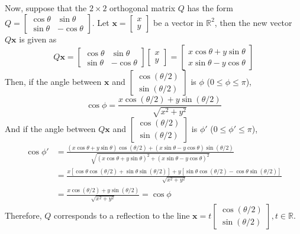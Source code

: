 Now, suppose that the $2 \times 2$ orthogonal matrix $Q$ has the form $Q = \begin{bmatrix}
	\cos \theta & \sin \theta \\ \sin \theta & -\cos \theta
\end{bmatrix}$. Let $\textbf{x} = \begin{bmatrix}
	x \\ y
\end{bmatrix}$ be a vector in $\mathbb{R}^2$, then the new vector $Q\textbf{x}$ is given as \begin{equation*}
	Q\textbf{x} = \begin{bmatrix}
		\cos \theta & \sin \theta \\ \sin \theta & -\cos \theta
	\end{bmatrix} \begin{bmatrix}
		x \\ y
	\end{bmatrix} = \begin{bmatrix}
		x\cos\theta + y\sin\theta \\ x\sin\theta - y\cos\theta
	\end{bmatrix}
\end{equation*} Then, if the angle between $\textbf{x}$ and $\begin{bmatrix}
\cos(\theta/2) \\ \sin(\theta/2)
\end{bmatrix}$ is $\phi$ ($0 \le \phi \le \pi$), \begin{equation*}
	\cos\phi = \frac{x \cos (\theta / 2) + y \sin (\theta /2)}{\sqrt{x^2 + y^2}}
\end{equation*} And if the angle between $Q\textbf{x}$ and $\begin{bmatrix}
\cos(\theta/2) \\ \sin(\theta/2)
\end{bmatrix}$ is $\phi'$ ($0 \le \phi' \le \pi$), \begin{align*}
	\cos \phi' &= \frac{(x \cos \theta + y \sin \theta)\cos(\theta / 2) + (x \sin \theta - y \cos \theta)\sin(\theta / 2)}{\sqrt{(x \cos \theta + y \sin \theta)^2 + (x \sin \theta - y \cos \theta)^2}} \\
	&= \frac{x[\cos\theta\cos(\theta/2)+\sin\theta\sin(\theta/2)] + y[\sin\theta\cos(\theta/2)-\cos\theta\sin(\theta/2)]}{\sqrt{x^2 + y^2}} \\
	&= \frac{x\cos(\theta/2) + y\sin(\theta/2)}{\sqrt{x^2 + y^2}} = \cos\phi
\end{align*}
Therefore, $Q$ corresponds to a reflection to the line $\textbf{x} = t\begin{bmatrix}
	\cos(\theta / 2) \\ \sin(\theta / 2)
\end{bmatrix}, t \in \mathbb{R}$. \\

